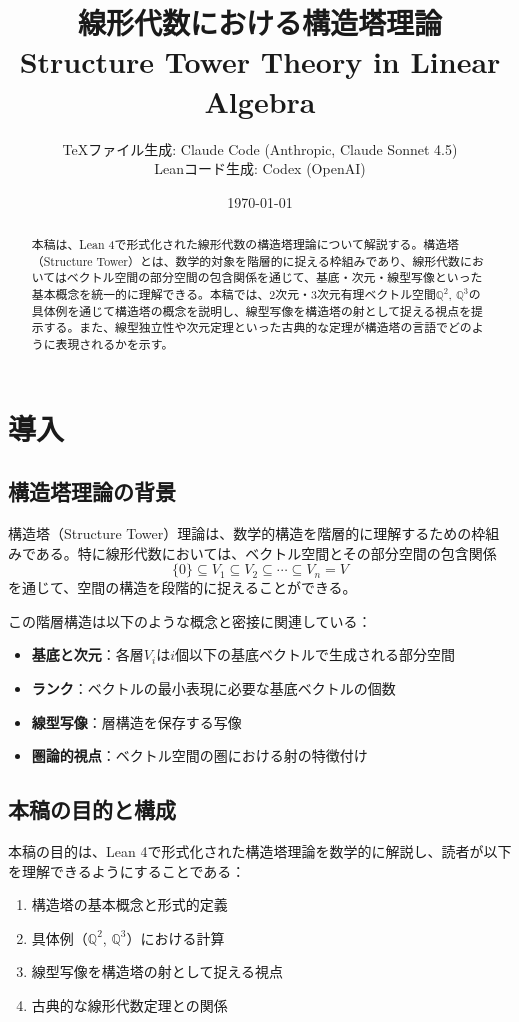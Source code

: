 \documentclass[11pt,a4paper]{ltjsarticle}
\title{線形代数における構造塔理論\\Structure Tower Theory in Linear Algebra}
\author{%
  TeXファイル生成: Claude Code (Anthropic, Claude Sonnet 4.5)\\
  Leanコード生成: Codex (OpenAI)
}
\date{\today}
\theoremstyle{definition}
\newcommand{\Q}{\mathbb{Q}}
\begin{document}
\maketitle

\begin{abstract}
本稿は、Lean 4で形式化された線形代数の構造塔理論について解説する。構造塔（Structure Tower）とは、数学的対象を階層的に捉える枠組みであり、線形代数においてはベクトル空間の部分空間の包含関係を通じて、基底・次元・線型写像といった基本概念を統一的に理解できる。本稿では、2次元・3次元有理ベクトル空間$\Q^2$, $\Q^3$の具体例を通じて構造塔の概念を説明し、線型写像を構造塔の射として捉える視点を提示する。また、線型独立性や次元定理といった古典的な定理が構造塔の言語でどのように表現されるかを示す。
\end{abstract}

\tableofcontents

\section{導入}

\subsection{構造塔理論の背景}

構造塔（Structure Tower）理論は、数学的構造を階層的に理解するための枠組みである。特に線形代数においては、ベクトル空間とその部分空間の包含関係
\[
\{0\} \subseteq V_1 \subseteq V_2 \subseteq \cdots \subseteq V_n = V
\]
を通じて、空間の構造を段階的に捉えることができる。

この階層構造は以下のような概念と密接に関連している：
\begin{itemize}
\item \textbf{基底と次元}：各層$V_i$は$i$個以下の基底ベクトルで生成される部分空間
\item \textbf{ランク}：ベクトルの最小表現に必要な基底ベクトルの個数
\item \textbf{線型写像}：層構造を保存する写像
\item \textbf{圏論的視点}：ベクトル空間の圏における射の特徴付け
\end{itemize}

\subsection{本稿の目的と構成}

本稿の目的は、Lean 4で形式化された構造塔理論を数学的に解説し、読者が以下を理解できるようにすることである：
\begin{enumerate}
\item 構造塔の基本概念と形式的定義
\item 具体例（$\Q^2$, $\Q^3$）における計算
\item 線型写像を構造塔の射として捉える視点
\item 古典的な線形代数定理との関係
\end{enumerate}
\end{document}
